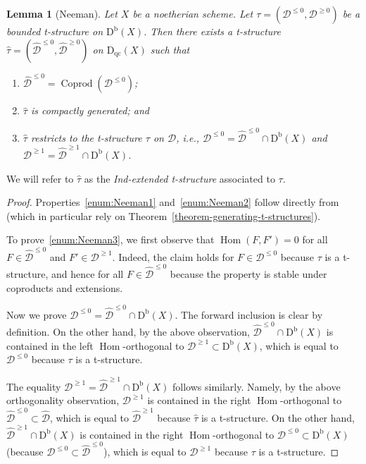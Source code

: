 \documentclass[11pt, reqno]{amsart}
\numberwithin{equation}{section}
\theoremstyle{plain}
\newtheorem{lemma}[theorem]{Lemma}
\theoremstyle{remark}
\theoremstyle{definition}
\theoremstyle{italicsname}
\newcommand{\Db}{\mathrm{D^b}}
\newcommand{\Dqc}{\mathrm{D}_{\mathrm{qc}}}
\DeclareMathOperator{\Coprod}{Coprod}
\DeclareMathOperator{\Hom}{Hom}
\newcommand{\cD}{\mathscr{D}}
\begin{document}
\begin{lemma}[Neeman]\label{lem:Neeman}
Let $X$ be a noetherian scheme. Let $\tau=(\cD^{\leqslant0},\cD^{\geqslant0})$ be a bounded t-structure on $\Db(X)$.
Then there exists a t-structure $\widehat{\tau}=(\widehat{\cD}^{\leqslant0},\widehat{\cD}^{\geqslant0})$ on $\Dqc(X)$ such that
\begin{enumerate}[{\rm (i)}]
    \item\label{enum:Neeman1} $\widehat{\cD}^{\leqslant0}=\Coprod(\cD^{\leqslant0})$;
    \item\label{enum:Neeman2} $\widehat{\tau}$ is compactly generated; and 
    \item\label{enum:Neeman3} $\widehat{\tau}$ restricts to the t-structure $\tau$ on $\cD$, i.e.,  $\cD^{\leqslant0}=\widehat{\cD}^{\leqslant0}\cap\Db(X)$ and $\cD^{\geqslant1}=\widehat{\cD}^{\geqslant1}\cap\Db(X)$.
\end{enumerate}
\end{lemma}

We will refer to $\widehat{\tau}$ as the \emph{Ind-extended t-structure} associated to $\tau$.

\begin{proof}
Properties~\ref{enum:Neeman1} and~\ref{enum:Neeman2} follow directly from~\cite[Lemma 4.1 and Remark 4.2]{Neeman:BoundedTstructPerfect} (which in particular rely on Theorem~\ref{theorem-generating-t-structures}).

To prove~\ref{enum:Neeman3}, we first observe that
$\Hom(F,F') = 0$ for all $F \in \widehat{\cD}^{\leqslant 0}$ and $F' \in \cD^{\geqslant 1}$. Indeed, the claim holds for $F \in \cD^{\leqslant 0}$ because $\tau$ is a t-structure, and hence for all $F \in \widehat{\cD}^{\leqslant 0}$ because the property is stable under coproducts and extensions. 

Now we prove $\cD^{\leqslant0}=\widehat{\cD}^{\leqslant0}\cap\Db(X)$. The forward inclusion is clear by definition. 
On the other hand, by the above observation, $\widehat{\cD}^{\leqslant0}\cap\Db(X)$ is contained in the left $\Hom$-orthogonal to $\cD^{\geqslant 1} \subset \Db(X)$, which is equal to $\cD^{\leqslant 0}$ because $\tau$ is a t-structure. 

The equality $\cD^{\geqslant1}=\widehat{\cD}^{\geqslant1}\cap\Db(X)$ follows similarly. 
Namely, by the above orthogonality observation, $\cD^{\geqslant1}$ is contained in the right $\Hom$-orthogonal to $\widehat{\cD}^{\leqslant 0} \subset \widehat{\cD}$, which is equal to $\widehat{\cD}^{\geqslant1}$ because $\widehat{\tau}$ is a t-structure. 
On the other hand, $\widehat{\cD}^{\geqslant1}\cap\Db(X)$ is contained in the right $\Hom$-orthogonal to $\cD^{\leqslant 0} \subset \Db(X)$ (because $\cD^{\leqslant 0} \subset \widehat{\cD}^{\leqslant 0}$), which is equal to $\cD^{\geqslant 1}$ because $\tau$ is a t-structure. 
\end{proof}
\end{document}
